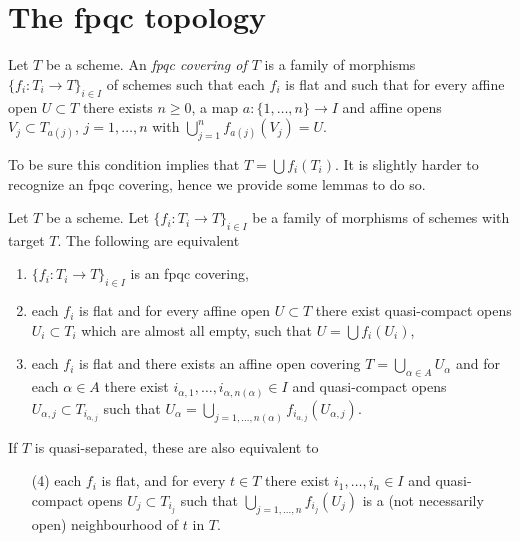 \section{The fpqc topology}
\label{section-fpqc}

\begin{definition}
\label{definition-fpqc-covering}
Let $T$ be a scheme. An {\it fpqc covering of $T$} is a family
of morphisms $\{f_i : T_i \to T\}_{i \in I}$ of schemes
such that each $f_i$ is flat and such that for every affine open
$U \subset T$ there exists $n \geq 0$, a map
$a : \{1, \ldots, n\} \to I$ and affine opens
$V_j \subset T_{a(j)}$, $j = 1, \ldots, n$
with $\bigcup_{j = 1}^n f_{a(j)}(V_j) = U$.
\end{definition}

\noindent
To be sure this condition implies that $T = \bigcup f_i(T_i)$.
It is slightly harder to recognize an fpqc covering, hence we provide
some lemmas to do so.

\begin{lemma}
\label{lemma-recognize-fpqc-covering}
Let $T$ be a scheme. Let $\{f_i : T_i \to T\}_{i \in I}$ be a family of
morphisms of schemes with target $T$. The following are equivalent
\begin{enumerate}
\item $\{f_i : T_i \to T\}_{i \in I}$ is an fpqc covering,
\item each $f_i$ is flat and for every affine open $U \subset T$
there exist quasi-compact opens
$U_i \subset T_i$ which are almost all empty,
such that $U = \bigcup f_i(U_i)$,
\item each $f_i$ is flat and there exists an affine open covering
$T = \bigcup_{\alpha \in A} U_\alpha$ and for each $\alpha \in A$
there exist $i_{\alpha, 1}, \ldots, i_{\alpha, n(\alpha)} \in I$
and quasi-compact opens $U_{\alpha, j} \subset T_{i_{\alpha, j}}$ such that
$U_\alpha =
\bigcup_{j = 1, \ldots, n(\alpha)} f_{i_{\alpha, j}}(U_{\alpha, j})$.
\end{enumerate}
If $T$ is quasi-separated, these are also equivalent to
\begin{enumerate}
\item[(4)] each $f_i$ is flat, and for every $t \in T$ there exist
$i_1, \ldots, i_n \in I$ and quasi-compact opens $U_j \subset T_{i_j}$
such that $\bigcup_{j = 1, \ldots, n} f_{i_j}(U_j)$ is a
(not necessarily open) neighbourhood of $t$ in $T$.
\end{enumerate}
\end{lemma}

